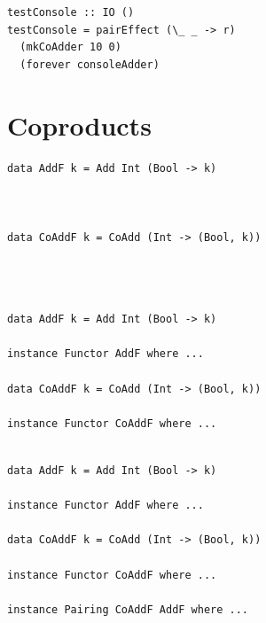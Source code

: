 \documentclass{beamer}
\begin{document}
\begin{frame}[fragile]
  \begin{verbatim}
testConsole :: IO ()
testConsole = pairEffect (\_ _ -> r)
  (mkCoAdder 10 0)
  (forever consoleAdder)
  \end{verbatim}
\end{frame}

\section{Coproducts}

\begin{frame}[fragile]
  \begin{overprint}
  \begin{verbatim}
data AddF k = Add Int (Bool -> k)



data CoAddF k = CoAdd (Int -> (Bool, k))




  \end{verbatim}
  \begin{verbatim}
data AddF k = Add Int (Bool -> k)

instance Functor AddF where ...

data CoAddF k = CoAdd (Int -> (Bool, k))

instance Functor CoAddF where ...


  \end{verbatim}
  \begin{verbatim}
data AddF k = Add Int (Bool -> k)

instance Functor AddF where ...

data CoAddF k = CoAdd (Int -> (Bool, k))

instance Functor CoAddF where ...

instance Pairing CoAddF AddF where ...
  \end{verbatim}
  \end{overprint}
\end{frame}
\end{document}
